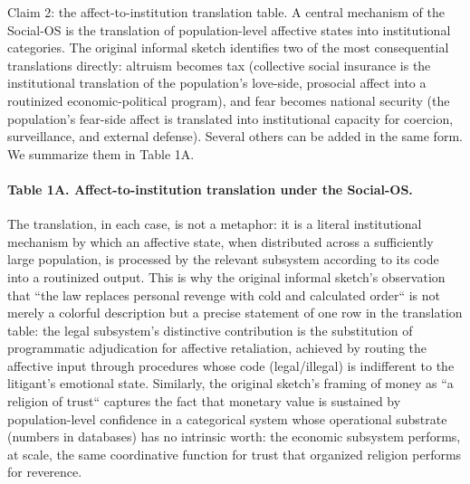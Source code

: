 \documentclass[12pt,a4paper]{article}
\begin{document}
Claim 2: the affect-to-institution translation table. A central mechanism of the Social-OS is the translation of population-level affective states into institutional categories. The original informal sketch identifies two of the most consequential translations directly: altruism becomes tax (collective social insurance is the institutional translation of the population's love-side, prosocial affect into a routinized economic-political program), and fear becomes national security (the population's fear-side affect is translated into institutional capacity for coercion, surveillance, and external defense). Several others can be added in the same form. We summarize them in Table 1A.


\paragraph{Table 1A. Affect-to-institution translation under the Social-OS.}



The translation, in each case, is not a metaphor: it is a literal institutional mechanism by which an affective state, when distributed across a sufficiently large population, is processed by the relevant subsystem according to its code into a routinized output. This is why the original informal sketch's observation that ``the law replaces personal revenge with cold and calculated order`` is not merely a colorful description but a precise statement of one row in the translation table: the legal subsystem's distinctive contribution is the substitution of programmatic adjudication for affective retaliation, achieved by routing the affective input through procedures whose code (legal/illegal) is indifferent to the litigant's emotional state. Similarly, the original sketch's framing of money as ``a religion of trust`` captures the fact that monetary value is sustained by population-level confidence in a categorical system whose operational substrate (numbers in databases) has no intrinsic worth: the economic subsystem performs, at scale, the same coordinative function for trust that organized religion performs for reverence.
\end{document}
